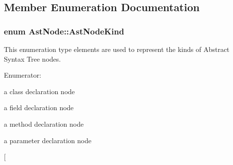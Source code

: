 \subsection{Member Enumeration Documentation}
\hypertarget{classAstNode_a365f519b5e9e517edc83566bd1cfe950}{
\subsubsection[{AstNodeKind}]{\setlength{\rightskip}{0pt plus 5cm}enum {\bf AstNode::AstNodeKind}}}
\label{classAstNode_a365f519b5e9e517edc83566bd1cfe950}
This enumeration type elements are used to represent the kinds of Abstract Syntax Tree nodes. \begin{Desc}
\item[Enumerator: ]\par
\begin{description}
\item[{\em 
\hypertarget{classAstNode_a365f519b5e9e517edc83566bd1cfe950a74f05149a25fe61dabeb25520382c1c2}{
DCLASS}
\label{classAstNode_a365f519b5e9e517edc83566bd1cfe950a74f05149a25fe61dabeb25520382c1c2}
}]a class declaration node \item[{\em 
\hypertarget{classAstNode_a365f519b5e9e517edc83566bd1cfe950af58ad2e4831b8c3c7789a3c4054642c5}{
DFIELD}
\label{classAstNode_a365f519b5e9e517edc83566bd1cfe950af58ad2e4831b8c3c7789a3c4054642c5}
}]a field declaration node \item[{\em 
\hypertarget{classAstNode_a365f519b5e9e517edc83566bd1cfe950ad3b8425047b32cc74fa3688c2da95761}{
DMETHOD}
\label{classAstNode_a365f519b5e9e517edc83566bd1cfe950ad3b8425047b32cc74fa3688c2da95761}
}]a method declaration node \item[{\em 
\hypertarget{classAstNode_a365f519b5e9e517edc83566bd1cfe950a1dd054e6f23331982e648d40a3a010f5}{
DPARAMETER}
\label{classAstNode_a365f519b5e9e517edc83566bd1cfe950a1dd054e6f23331982e648d40a3a010f5}
}]a parameter declaration node \item[{\em 
\hypertarget{classAstNode_a365f519b5e9e517edc83566bd1cfe950a63ec96e21ca1021019b7e5d2f11e71b1}{
}}
\end{description}
\end{Desc}
